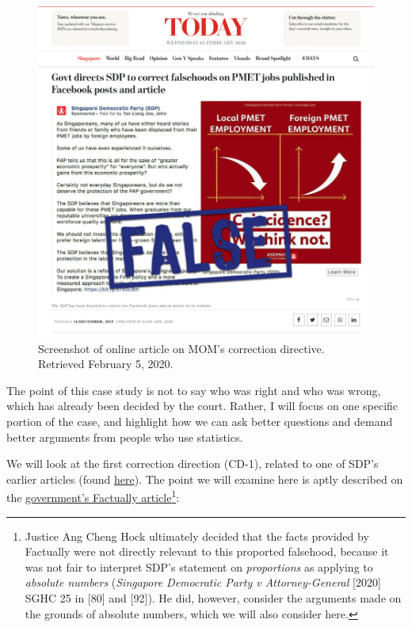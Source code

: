 \documentclass[openany]{book}
\let\rmarkdownfootnote\footnote%
\def\footnote{\protect\rmarkdownfootnote}
\begin{document}
\begin{figure}

{\centering \includegraphics[width=0.8\linewidth]{images/yousayisay/news1} 

}

\caption{Screenshot of online article on MOM's correction directive. Retrieved February 5, 2020.}\label{fig:today-sdp}
\end{figure}

The point of this case study is not to say who was right and who was
wrong, which has already been decided by the court. Rather, I will focus
on one specific portion of the case, and highlight how we can ask better
questions and demand better arguments from people who use statistics.

We will look at the first correction direction (CD-1), related to one of
SDP's earlier articles (found
\href{https://yoursdp.org/news/sdp_population_policy_hire_s_39_poreans_first_retrench_s_39_poreans_last}{here}).
The point we will examine here is aptly described on the
\href{https://www.gov.sg/article/factually-corrections-on-falsehoods-posted-by-sdp}{government's
Factually article}\footnote{Justice Ang Cheng Hock ultimately decided
  that the facts provided by Factually were not directly relevant to
  this proported falsehood, because it was not fair to interpret SDP's
  statement on \emph{proportions} as applying to \emph{absolute numbers}
  (\emph{Singapore Democratic Party v Attorney-General} {[}2020{]} SGHC
  25 in {[}80{]} and {[}92{]}). He did, however, consider the arguments
  made on the grounds of absolute numbers, which we will also consider
  here.}:
\end{document}
